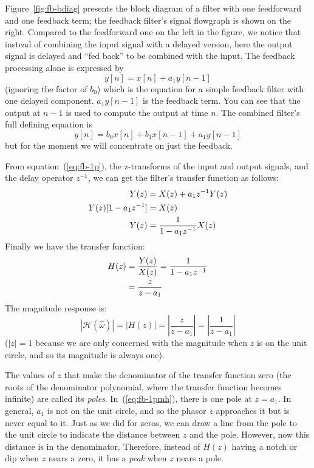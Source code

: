 Figure~\ref{fig:fb-bdiag} presents the block diagram of a filter with
one feedforward and one feedback term; the feedback filter's signal
flowgraph is shown on the right. Compared to the feedforward one on
the left in the figure, we notice that instead of combining the input
signal with a delayed version, here the output signal is delayed and
``fed back'' to be combined with the input. The feedback processing
alone is expressed by
\begin{equation}
y[n] = x[n] + a_1 y[n-1]
\label{eq:fb-1p}
\end{equation}
(ignoring the factor of $b_0$) which is the equation for a simple
feedback filter with one delayed component. $a_1 y[n-1]$ is the
feedback term. You can see that the output at $n-1$ is used to compute
the output at time $n$. The combined filter's full defining equation
is
\begin{equation}
  y[n] = b_0 x[n] + b_1 x[n-1] + a_1 y[n-1]
  \label{eq:fb-ff}
\end{equation}
but for the moment we will concentrate on just the feedback.

From equation~(\ref{eq:fb-1p}), the z-transforms of the input and
output signals, and the delay operator $z^{-1}$, we can get the
filter's transfer function as follows:
\begin{align}
Y(z) &= X(z) + a_1z^{-1}Y(z) \notag\\
Y(z)[1-a_1z^{-1}] &= X(z) \notag\\
Y(z) &= \frac{1}{1-a_1z^{-1}}X(z)
\end{align}
Finally we have the transfer function:
\begin{align}
H(z) &= \frac{Y(z)}{X(z)} = \frac{1}{1-a_1z^{-1}} \notag \\
     &= \frac{z}{z-a_1} \label{eq:fb-xfer}
\end{align}
The magnitude response is:
\begin{equation}
|\mathcal{H}(\hat{\omega})|
  = |H(z)|
  = \left|\frac{z}{z-a_1}\right|=\left|\frac{1}{z-a_1}\right|
\label{eq:fb-1pmh}
\end{equation}
($|z|=1$ because we are only concerned with the magnitude when $z$ is
on the unit circle, and so its magnitude is always one).

 The values of $z$ that make the denominator
of the transfer function zero (the roots of the denominator
polynomial, where the transfer function becomes infinite) are called
its \emph{poles}. In~(\ref{eq:fb-1pmh}), there is one pole at
$z=a_1$. In general, $a_1$ is not on the unit circle, and so the
phasor $z$ approaches it but is never equal to it.  Just as we did for
zeros, we can draw a line from the pole to the unit circle to indicate
the distance between $z$ and the pole.  However, now this distance is
in the denominator. Therefore, instead of $H(z)$ having a notch or dip
when $z$ nears a zero, it has a \emph{peak} when $z$ nears a pole.

